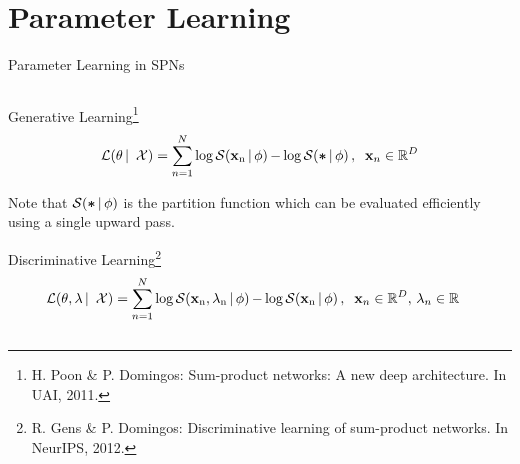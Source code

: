 \section{Parameter Learning}

\begin{frame}{Parameter Learning in SPNs}{}
\begin{columns}
\begin{column}{\linewidth}
\begin{block}{Generative Learning\footnote{\scriptsize H. Poon \& P. Domingos: Sum-product networks: A new deep architecture. In UAI, 2011.}}
\begin{equation}
  \mathcal{L}(\theta \,| \, \mathcal{X}) = \sum_{n=1}^N \log \f - \log \fz\, , \; \; \xn \in \mathbb{R}^D
\end{equation}
\end{block}
Note that $\operatorname*{\mathcal{S}(\bm \ast \,|\, \phi)}$ is the partition function which can be evaluated efficiently using a single upward pass.
\begin{block}{Discriminative Learning\footnote{\scriptsize R. Gens \& P. Domingos: Discriminative learning of sum-product networks. In NeurIPS, 2012.}}
\begin{equation}
  \begin{aligned}
    \mathcal{L}(\theta, \lambda \,| \, \mathcal{X}) = \sum_{n=1}^N &\log \fy - \log \f\, , \; \; \xn \in \mathbb{R}^D, \, \lambda_n \in \mathbb{R}
\end{aligned}
\end{equation}
\end{block}
\end{column}
\end{columns}
\end{frame}

